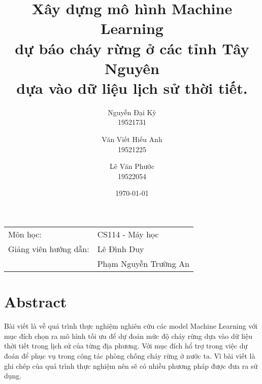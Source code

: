 \documentclass{article}
\begin{document}
\title{
      \LARGE{
            \textbf{
                  Xây dựng mô hình Machine Learning \\ dự báo cháy rừng ở các tỉnh Tây Nguyên \\ dựa vào dữ liệu lịch sử thời tiết.
            }
      }
}

\author{
      Nguyễn Đại Kỳ\\
      19521731\\
      \and
      Văn Viết Hiếu Anh\\
      19521225
      \and
      Lê Văn Phước\\
      19522054
}

\date{\today} %
\maketitle %
\begin{center}
      \begin{tabular}{l l}
            Môn học:              & CS114 - Máy học       \\
            Giảng viên hướng dẫn: & Lê Đình Duy           \\
                                  & Phạm Nguyễn Trường An \\
      \end{tabular}
\end{center}

\tableofcontents

\pagebreak


\section{Abstract}

\qquad Bài viết là về quá trình thực nghiệm nghiên cứu các model Machine Learning với mục đích chọn ra mô hình tối ưu để dự đoán mức độ cháy rừng dựa vào dữ liệu thời tiết trong lịch sử của từng địa phương. Với mục đích hổ trợ trong việc dự đoán để phục vụ trong công tác phòng chống cháy rừng ở nước ta. Vì bài viết là ghi chép của quá trình thực nghiệm nên sẽ có nhiều phương pháp được đưa ra sử dụng.

\end{document}

